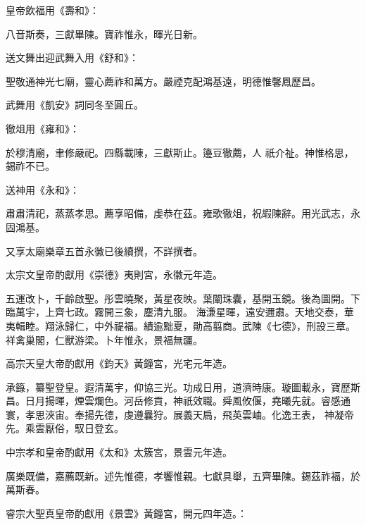 \begin{pinyinscope}
 皇帝飲福用《壽和》：



 八音斯奏，三獻畢陳。寶祚惟永，暉光日新。



 送文舞出迎武舞入用《舒和》：



 聖敬通神光七廟，靈心薦祚和萬方。嚴禋克配鴻基遠，明德惟馨鳳歷昌。



 武舞用《凱安》詞同冬至圓丘。



 徹俎用《雍和》：



 於穆清廟，聿修嚴祀。四縣載陳，三獻斯止。籩豆徹薦，人
 祇介祉。神惟格思，錫祚不已。



 送神用《永和》：



 肅肅清祀，蒸蒸孝思。薦享昭備，虔恭在茲。雍歌徹俎，祝嘏陳辭。用光武志，永固鴻基。



 又享太廟樂章五首永徽已後續撰，不詳撰者。



 太宗文皇帝酌獻用《崇德》夷則宮，永徽元年造。



 五運改卜，千齡啟聖。彤雲曉聚，黃星夜映。葉闡珠囊，基開玉鏡。後為圖開。下臨萬宇，上齊七政。霧開三象，塵清九服。
 海溓星暉，遠安邇肅。天地交泰，華夷輯睦。翔泳歸仁，中外禔福。績逾黜夏，勛高翦商。武陳《七德》，刑設三章。祥禽巢閣，仁獸游梁。卜年惟永，景福無疆。



 高宗天皇大帝酌獻用《鈞天》黃鐘宮，光宅元年造。



 承籙，纂聖登皇。遐清萬宇，仰協三光。功成日用，道濟時康。璇圖載永，寶歷斯昌。日月揚暉，煙雲爛色。河岳修貢，神祇效職。舜風攸偃，堯曦先就。睿感通寰，孝思浹宙。奉揚先德，虔遵曩狩。展義天扃，飛英雲岫。化逸王表，
 神凝帝先。乘雲厭俗，馭日登玄。



 中宗孝和皇帝酌獻用《太和》太簇宮，景雲元年造。



 廣樂既備，嘉薦既新。述先惟德，孝饗惟親。七獻具舉，五齊畢陳。錫茲祚福，於萬斯春。



 睿宗大聖真皇帝酌獻用《景雲》黃鐘宮，開元四年造。：




\end{pinyinscope}
